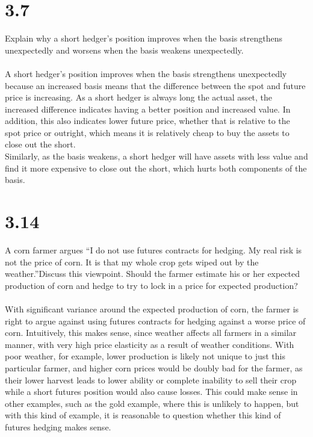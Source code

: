 \documentclass{article}
\begin{document}
{\Large 

\section*{3.7}

Explain why a short hedger's position improves when the basis strengthens unexpectedly and worsens when the basis weakens unexpectedly. \\ \\
A short hedger's position improves when the basis strengthens unexpectedly because an increased basis means that the difference between the spot and future price is increasing. As a short hedger is always long the actual asset, the increased difference indicates having a better position and increased value. In addition, this also indicates lower future price, whether that is relative to the spot price or outright, which means it is relatively cheap to buy the assets to close out the short. \\
Similarly, as the basis weakens, a short hedger will have assets with less value and find it more expensive to close out the short, which hurts both components of the basis. 

}
{\Large 

\section*{3.14}

A corn farmer argues “I do not use futures contracts for hedging. My real risk is not the price of corn. It is that my whole crop gets wiped out by the weather.”Discuss this viewpoint. Should the farmer estimate his or her expected production of corn and hedge to try to lock in a price for expected production? \\ \\
With significant variance around the expected production of corn, the farmer is right to argue against using futures contracts for hedging against a worse price of corn. Intuitively, this makes sense, since weather affects all farmers in a similar manner, with very high price elasticity as a result of weather conditions. With poor weather, for example, lower production is likely not unique to just this particular farmer, and higher corn prices would be doubly bad for the farmer, as their lower harvest leads to lower ability or complete inability to sell their crop while a short futures position would also cause losses. This could make sense in other examples, such as the gold example, where this is unlikely to happen, but with this kind of example, it is reasonable to question whether this kind of futures hedging makes sense. 

}
\end{document}
